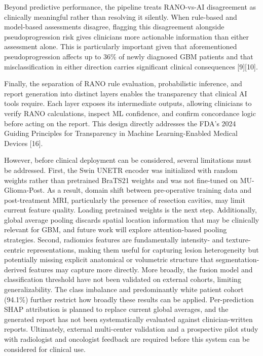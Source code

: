 \documentclass[letterpaper, 10pt, conference]{IEEEtran}
\begin{document}
Beyond predictive performance, the pipeline treats RANO-vs-AI disagreement as clinically meaningful rather than
resolving it silently. When rule-based and model-based assessments disagree, flagging this disagreement alongside
pseudoprogression risk gives clinicians more actionable information than either assessment alone. This is
particularly important given that aforementioned pseudoprogression affects up to 36\% of newly diagnosed GBM patients
and that misclassification in either direction carries significant clinical consequences [9][10].

Finally, the separation of RANO rule evaluation, probabilistic inference, and report generation into distinct layers
enables the transparency that clinical AI tools require. Each layer exposes its intermediate outputs, allowing
clinicians to verify RANO calculations, inspect ML confidence, and confirm concordance logic before acting on the
report. This design directly addresses the FDA's 2024 Guiding Principles for Transparency in Machine
Learning-Enabled Medical Devices [16].

However, before clinical deployment can be considered, several limitations must be addressed. First, the Swin UNETR
encoder was initialized with random weights rather than pretrained BraTS21 weights and was not fine-tuned on
MU-Glioma-Post. As a result, domain shift between pre-operative training data and post-treatment MRI, particularly
the presence of resection cavities, may limit current feature quality. Loading pretrained weights is the next step.
Additionally, global average pooling discards spatial location information that may be clinically relevant for GBM,
and future work will explore attention-based pooling strategies. Second, radiomics features are fundamentally
intensity- and texture-centric representations, making them useful for capturing lesion heterogeneity but
potentially missing explicit anatomical or volumetric structure that segmentation-derived features may capture more
directly. More broadly, the fusion model and classification threshold have not been validated on external cohorts,
limiting generalizability. The class imbalance and predominantly white patient cohort (94.1\%) further restrict how
broadly these results can be applied. Per-prediction SHAP attribution is planned to replace current global averages,
and the generated report has not been systematically evaluated against clinician-written reports. Ultimately,
external multi-center validation and a prospective pilot study with radiologist and oncologist feedback are required
before this system can be considered for clinical use.
\end{document}
